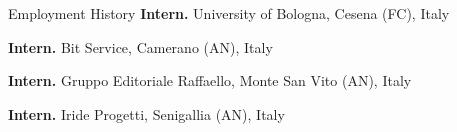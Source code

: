 \begin{rubric}{Employment History}
\entry*[2021]%
	\textbf{Intern.} University of Bologna, Cesena (FC), Italy

\entry*[2017]%
	\textbf{Intern.} Bit Service, Camerano (AN), Italy

\entry*[2017]%
	\textbf{Intern.} Gruppo Editoriale Raffaello, Monte San Vito (AN), Italy

\entry*[2016]%
	\textbf{Intern.} Iride Progetti, Senigallia (AN), Italy
%
\end{rubric}